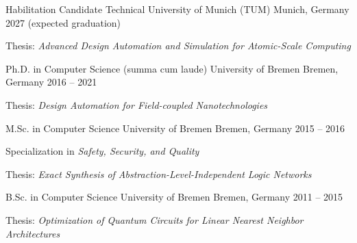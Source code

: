 

\begin{cventries}

  \cventry
    {Habilitation Candidate} %
    {Technical University of Munich (TUM)} %
    {Munich, Germany} %
    {2027 (expected graduation)} %
    {
      \begin{cvitems} %
        \item {Thesis: \emph{Advanced Design Automation and Simulation for Atomic-Scale Computing}}
      \end{cvitems}
    }

  \cventry
    {Ph.D. in Computer Science (summa cum laude)} %
    {University of Bremen} %
    {Bremen, Germany} %
    {2016 -- 2021} %
    {
      \begin{cvitems} %
        \item {Thesis: \emph{Design Automation for Field-coupled Nanotechnologies}}
      \end{cvitems}
    }

  \cventry
    {M.Sc. in Computer Science} %
    {University of Bremen} %
    {Bremen, Germany} %
    {2015 -- 2016} %
    {
      \begin{cvitems} %
        \item {Specialization in \emph{Safety, Security, and Quality}}
        \item {Thesis: \emph{Exact Synthesis of Abstraction-Level-Independent Logic Networks}}
      \end{cvitems}
    }

  \cventry
    {B.Sc. in Computer Science} %
    {University of Bremen} %
    {Bremen, Germany} %
    {2011 -- 2015} %
    {
      \begin{cvitems} %
        \item {Thesis: \emph{Optimization of Quantum Circuits for Linear Nearest Neighbor Architectures}}
      \end{cvitems}
    }

\end{cventries}
